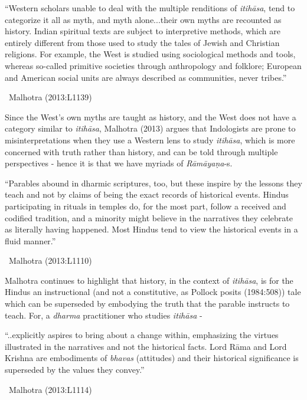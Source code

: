 \begin{myquote}
“Western scholars unable to deal with the multiple renditions of \textit{itihāsa}, tend to categorize it all as myth, and myth alone...their own myths are recounted as history. Indian spiritual texts are subject to interpretive methods, which are entirely different from those used to study the tales of Jewish and Christian religions. For example, the West is studied using sociological methods and tools, whereas so-called primitive societies through anthropology and folklore; European and American social units are always described as communities, never tribes.”

~\hfill Malhotra (2013:L1139)
\end{myquote}

Since the West’s own myths are taught as history, and the West does not have a category similar to \textit{itihāsa}, Malhotra (2013) argues that Indologists are prone to misinterpretations when they use a Western lens to study \textit{itihāsa}, which is more concerned with truth rather than history, and can be told through multiple perspectives - hence it is that we have myriads of \textit{Rāmāyaṇa}-s.

\begin{myquote}
“Parables abound in dharmic scriptures, too, but these inspire by the lessons they teach and not by claims of being the exact records of historical events. Hindus participating in rituals in temples do, for the most part, follow a received and codified tradition, and a minority might believe in the narratives they celebrate as literally having happened. Most Hindus tend to view the historical events in a fluid manner.”

~\hfill Malhotra (2013:L1110)
\end{myquote}

Malhotra continues to highlight that history, in the context of \textit{itihāsa}, is for the Hindus an instructional (and not a constitutive, as Pollock posits (1984:508)) tale which can be superseded by embodying the truth that the parable instructs to teach. For, a \textit{dharma} practitioner who studies \textit{itihāsa} -

\begin{myquote}
“..explicitly aspires to bring about a change within, emphasizing the virtues illustrated in the narratives and not the historical facts. Lord Rāma and Lord Krishna are embodiments of \textit{bhavas} (attitudes) and their historical significance is superseded by the values they convey.”

~\hfill Malhotra (2013:L1114)
\end{myquote}

